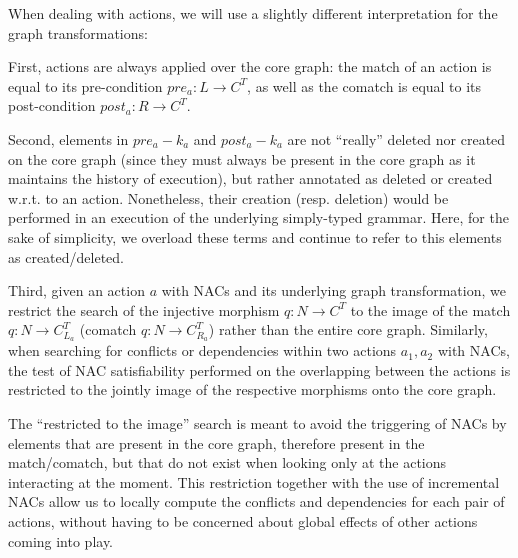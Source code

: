 \begin{remark} When dealing with actions, we will use a slightly different interpretation for the graph transformations:
  
First, actions are always applied over the core graph: the match of an action is equal to its pre-condition $pre_a : L \rightarrow C^T$, as well as the comatch is equal to its post-condition $post_a : R \rightarrow C^T$. 
  
  Second, elements in $pre_a - k_a$ and $post_a - k_a$ are not ``really'' deleted nor created on the core graph (since they must always be present in the core graph as it maintains the history of execution), but rather annotated as deleted or created w.r.t. to an action. Nonetheless, their creation (resp. deletion) would be performed in an execution of the underlying simply-typed grammar. Here, for the sake of simplicity, we overload these terms and continue to refer to this elements as created/deleted.

  Third, given an action $a$ with NACs and its underlying graph transformation, we restrict the search of the injective morphism $q : N \rightarrow C^T$ to the image of the match $q : N \rightarrow C^T_{L_a}$ (comatch $q : N \rightarrow C^T_{R_a}$) rather than the entire core graph. Similarly, when searching for conflicts or dependencies within two actions $a_1, a_2$ with NACs, the test of NAC satisfiability performed on the overlapping between the actions is restricted to the jointly image of the respective morphisms onto the core graph.

  The ``restricted to the image'' search is meant to avoid the triggering of NACs by elements that are present in the core graph, therefore present in the match/comatch, but that do not exist when looking only at the actions interacting at the moment. This restriction together with the use of incremental NACs allow us to locally compute the conflicts and dependencies for each pair of actions, without having to be concerned about global effects of other actions coming into play.
\end{remark}

